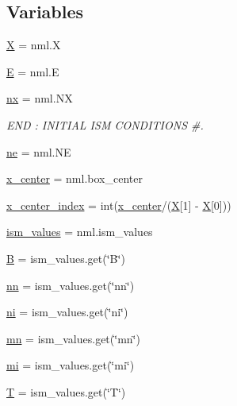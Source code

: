 \subsection*{Variables}
\begin{DoxyCompactItemize}
\item 
\hyperlink{namespacesetup__adve_ac58005e2708a29ed334e0542dd68d336}{X} = nml.\+X
\item 
\hyperlink{namespacesetup__adve_a924af0e190ae028ed71b0d7b9dd75fed}{E} = nml.\+E
\item 
\hyperlink{namespacesetup__adve_ac569d81a0aa7aa3e34dbefa419058aef}{nx} = nml.\+NX
\begin{DoxyCompactList}\small\item\em E\+ND \+: I\+N\+I\+T\+I\+AL I\+SM C\+O\+N\+D\+I\+T\+I\+O\+NS \#. \end{DoxyCompactList}\item 
\hyperlink{namespacesetup__adve_a639795655f65ebd8a329d9ac4ec030f8}{ne} = nml.\+NE
\item 
\hyperlink{namespacesetup__adve_afa7c21c6336dc951736e8cc7f1510d4d}{x\+\_\+center} = nml.\+box\+\_\+center
\item 
\hyperlink{namespacesetup__adve_a1e6b2f1458d90ff7abdb915f94f94219}{x\+\_\+center\+\_\+index} = int(\hyperlink{namespacesetup__adve_afa7c21c6336dc951736e8cc7f1510d4d}{x\+\_\+center}/(\hyperlink{namespacesetup__adve_ac58005e2708a29ed334e0542dd68d336}{X}\mbox{[}1\mbox{]} -\/ \hyperlink{namespacesetup__adve_ac58005e2708a29ed334e0542dd68d336}{X}\mbox{[}0\mbox{]}))
\item 
\hyperlink{namespacesetup__adve_a7d8318ffb2cca573a4683c33a71197c2}{ism\+\_\+values} = nml.\+ism\+\_\+values
\item 
\hyperlink{namespacesetup__adve_a8407cf4af8a6a0ba27e5697dfc8b2796}{B} = ism\+\_\+values.\+get(\char`\"{}B\char`\"{})
\item 
\hyperlink{namespacesetup__adve_af1a674904a55e26cc6656a13d251171a}{nn} = ism\+\_\+values.\+get(\char`\"{}nn\char`\"{})
\item 
\hyperlink{namespacesetup__adve_aed9cf6d26a4eafe73c5521ccd90c839f}{ni} = ism\+\_\+values.\+get(\char`\"{}ni\char`\"{})
\item 
\hyperlink{namespacesetup__adve_a2daf92857dc5973a05d894becd3cc7ae}{mn} = ism\+\_\+values.\+get(\char`\"{}mn\char`\"{})
\item 
\hyperlink{namespacesetup__adve_a24f12e269f341eb38c7ba4c093877507}{mi} = ism\+\_\+values.\+get(\char`\"{}mi\char`\"{})
\item 
\hyperlink{namespacesetup__adve_a5e9e657724fef9828959999ef9afe02b}{T} = ism\+\_\+values.\+get(\char`\"{}T\char`\"{})

\end{DoxyCompactItemize}
